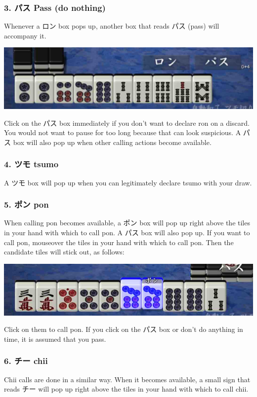 \subsubsection{3. パス Pass (do nothing)}
Whenever a ロン box pops up, another box that reads パス (pass) will accompany it. 
\begin{center}
\includegraphics[width=.7\textwidth,clip]{figs/ron.jpg}
\end{center}
Click on the パス box immediately if you don't want to declare {\jap ron} on a discard. You would not want to pause for too long because that can look suspicious. A パス box will also pop up when other calling actions become available. 

\subsubsection{4. ツモ {\jap tsumo} \textipa{[ts\'umo]}}
A ツモ box will pop up when you can legitimately declare {\jap tsumo} with your draw. 

\subsubsection{5. ポン {\jap pon} \textipa{[p\'\textopeno\ng]}}
When calling {\jap pon} becomes available, a ポン box will pop up right above the tiles in your hand with which to call {\jap pon}. A パス box will also pop up. If you want to call {\jap pon}, mouseover the tiles in your hand with which to call {\jap pon}. Then the candidate tiles will stick out, as follows:
\begin{center}
\includegraphics[width=.7\textwidth,clip]{figs/pung.jpg}
\end{center}
Click on them to call {\jap pon}. If you click on the パス box or don't do anything in time, it is assumed that you pass. 

\subsubsection{6. チー {\jap chii} }
{\jap Chii} calls are done in a similar way. When it becomes available, a small sign that reads チー will pop up right above the tiles in your hand with which to call {\jap chii}. 

